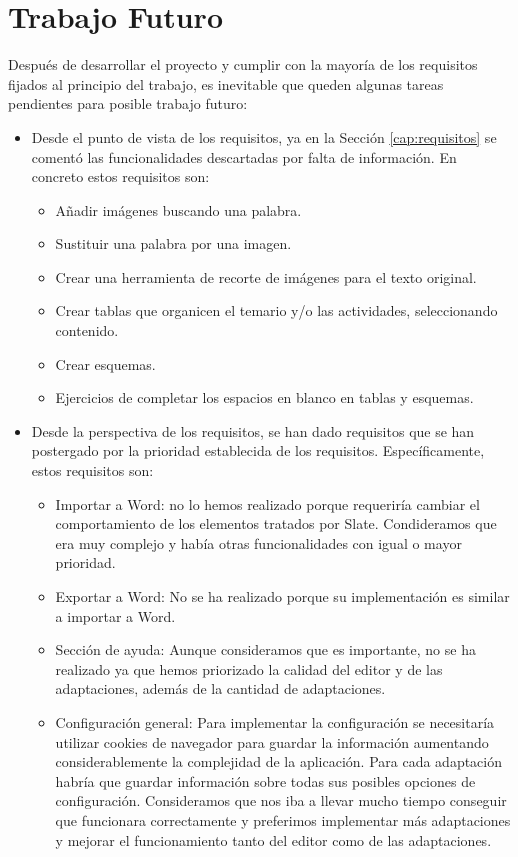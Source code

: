 \section{Trabajo Futuro}
\label{sec:TrabajoFuturo}
Después de desarrollar el proyecto y cumplir con la mayoría de los requisitos fijados al principio del trabajo, es inevitable que queden algunas tareas pendientes para posible trabajo futuro:

\begin{itemize}
    \item Desde el punto de vista de los requisitos, ya en la Sección \ref{cap:requisitos} se comentó las funcionalidades descartadas por falta de información. En concreto estos requisitos son: 
    \begin{itemize}
        \item Añadir imágenes buscando una palabra.
        \item Sustituir una palabra por una imagen.
        \item Crear una herramienta de recorte de imágenes para el texto original.
        \item Crear tablas que organicen el temario y/o las actividades, seleccionando contenido.
        \item Crear esquemas.
        \item Ejercicios de completar los espacios en blanco en tablas y esquemas.        
    \end{itemize}
    \item Desde la perspectiva de los requisitos, se han dado requisitos que se han postergado por la prioridad establecida de los requisitos. Específicamente, estos requisitos son:
    \begin{itemize}
        \item Importar a Word: no lo hemos realizado porque requeriría cambiar el comportamiento de los elementos tratados por Slate. Condideramos que era muy complejo y había otras funcionalidades con igual o mayor prioridad.
        \item Exportar a Word: No se ha realizado porque su implementación es similar a importar a Word.      
        \item Sección de ayuda: Aunque consideramos que es importante, no se ha realizado ya que hemos priorizado la calidad del editor y de las adaptaciones, además de la cantidad de adaptaciones.
        \item Configuración general: Para implementar la configuración se necesitaría utilizar cookies de navegador para guardar la información aumentando considerablemente la complejidad de la aplicación. Para cada adaptación habría que guardar información sobre todas sus posibles opciones de configuración. Consideramos que nos iba a llevar mucho tiempo conseguir que funcionara correctamente y preferimos implementar más adaptaciones y mejorar el funcionamiento tanto del editor como de las adaptaciones.
    \end{itemize}
\end{itemize}



